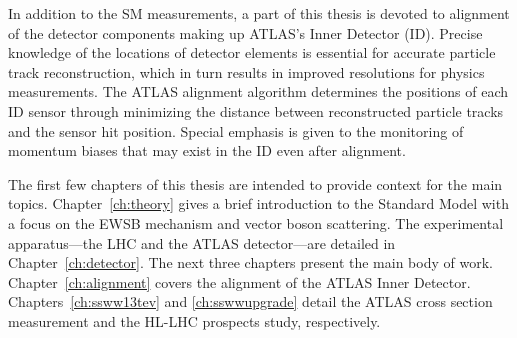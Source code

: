 In addition to the SM measurements, a part of this thesis is devoted to alignment of the detector components making up ATLAS's Inner Detector (ID).
Precise knowledge of the locations of detector elements is essential for accurate particle track reconstruction, which in turn results in improved resolutions for physics measurements.
The ATLAS alignment algorithm determines the positions of each ID sensor through minimizing the distance between reconstructed particle tracks and the sensor hit position.
Special emphasis is given to the monitoring of momentum biases that may exist in the ID even after alignment.

The first few chapters of this thesis are intended to provide context for the main topics.
Chapter~\ref{ch:theory} gives a brief introduction to the Standard Model with a focus on the EWSB mechanism and vector boson scattering.
The experimental apparatus---the LHC and the ATLAS detector---are detailed in Chapter~\ref{ch:detector}.
The next three chapters present the main body of work.
Chapter~\ref{ch:alignment} covers the alignment of the ATLAS Inner Detector.
Chapters~\ref{ch:ssww13tev} and \ref{ch:sswwupgrade} detail the ATLAS  \ssww cross section measurement and the  HL-LHC \ssww prospects study, respectively.

